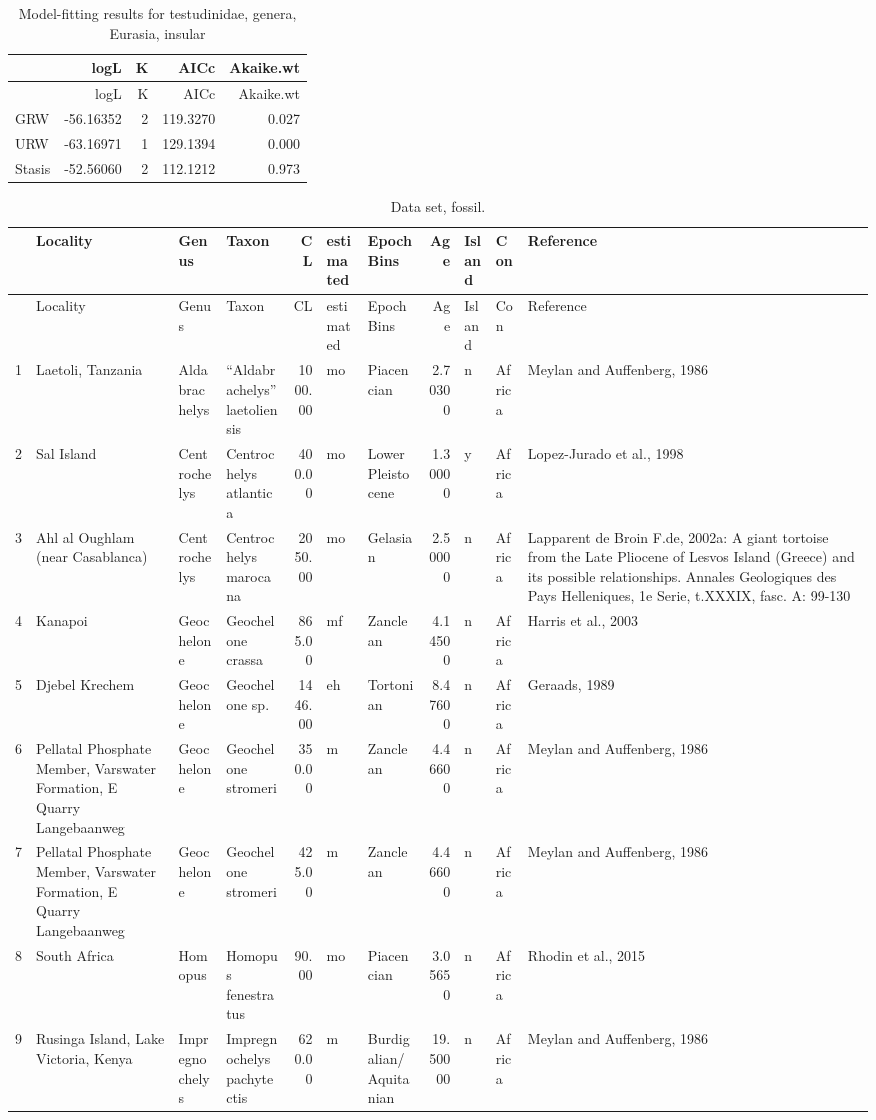 \documentclass[]{article}
\begin{document}
\begin{longtable}[]{@{}lrrrr@{}}
\caption{Model-fitting results for testudinidae, genera, Eurasia,
insular}\tabularnewline
\toprule
& logL & K & AICc & Akaike.wt\tabularnewline
\midrule
\endfirsthead
\toprule
& logL & K & AICc & Akaike.wt\tabularnewline
\midrule
\endhead
GRW & -56.16352 & 2 & 119.3270 & 0.027\tabularnewline
URW & -63.16971 & 1 & 129.1394 & 0.000\tabularnewline
Stasis & -52.56060 & 2 & 112.1212 & 0.973\tabularnewline
\bottomrule
\end{longtable}

\begin{longtable}[]{@{}llllrllrlll@{}}
\caption{Data set, fossil.}\tabularnewline
\toprule
& Locality & Genus & Taxon & CL & estimated & EpochBins & Age & Island &
Con & Reference\tabularnewline
\midrule
\endfirsthead
\toprule
& Locality & Genus & Taxon & CL & estimated & EpochBins & Age & Island &
Con & Reference\tabularnewline
\midrule
\endhead
1 & Laetoli, Tanzania & Aldabrachelys & ``Aldabrachelys'' laetoliensis &
1000.00 & mo & Piacencian & 2.70300 & n & Africa & Meylan and
Auffenberg, 1986\tabularnewline
2 & Sal Island & Centrochelys & Centrochelys atlantica & 400.00 & mo &
Lower Pleistocene & 1.30000 & y & Africa & Lopez-Jurado et al.,
1998\tabularnewline
3 & Ahl al Oughlam (near Casablanca) & Centrochelys & Centrochelys
marocana & 2050.00 & mo & Gelasian & 2.50000 & n & Africa & Lapparent de
Broin F.de, 2002a: A giant tortoise from the Late Pliocene of Lesvos
Island (Greece) and its possible relationships. Annales Geologiques des
Pays Helleniques, 1e Serie, t.XXXIX, fasc. A: 99-130\tabularnewline
4 & Kanapoi & Geochelone & Geochelone crassa & 865.00 & mf & Zanclean &
4.14500 & n & Africa & Harris et al., 2003\tabularnewline
5 & Djebel Krechem & Geochelone & Geochelone sp. & 1446.00 & eh &
Tortonian & 8.47600 & n & Africa & Geraads, 1989\tabularnewline
6 & Pellatal Phosphate Member, Varswater Formation, E Quarry
Langebaanweg & Geochelone & Geochelone stromeri & 350.00 & m & Zanclean
& 4.46600 & n & Africa & Meylan and Auffenberg, 1986\tabularnewline
7 & Pellatal Phosphate Member, Varswater Formation, E Quarry
Langebaanweg & Geochelone & Geochelone stromeri & 425.00 & m & Zanclean
& 4.46600 & n & Africa & Meylan and Auffenberg, 1986\tabularnewline
8 & South Africa & Homopus & Homopus fenestratus & 90.00 & mo &
Piacencian & 3.05650 & n & Africa & Rhodin et al., 2015\tabularnewline
9 & Rusinga Island, Lake Victoria, Kenya & Impregnochelys &
Impregnochelys pachytectis & 620.00 & m & Burdigalian/Aquitanian &
19.50000 & n & Africa & Meylan and Auffenberg, 1986\tabularnewline

\end{longtable}
\end{document}
